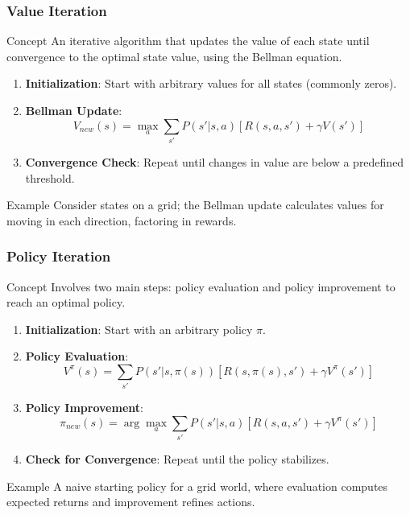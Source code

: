 \documentclass[aspectratio=169]{beamer}
\begin{document}
\begin{frame}[fragile]
    \frametitle{Value Iteration}
    \begin{block}{Concept}
        An iterative algorithm that updates the value of each state until convergence to the optimal state value, using the Bellman equation.
    \end{block}
    \begin{enumerate}
        \item \textbf{Initialization}: Start with arbitrary values for all states (commonly zeros).
        \item \textbf{Bellman Update}:
        \begin{equation}
            V_{new}(s) = \max_{a} \sum_{s'} P(s'|s, a) [R(s, a, s') + \gamma V(s')]
        \end{equation}
        \item \textbf{Convergence Check}: Repeat until changes in value are below a predefined threshold.
    \end{enumerate}
    \begin{block}{Example}
        Consider states on a grid; the Bellman update calculates values for moving in each direction, factoring in rewards.
    \end{block}
\end{frame}

\begin{frame}[fragile]
    \frametitle{Policy Iteration}
    \begin{block}{Concept}
        Involves two main steps: policy evaluation and policy improvement to reach an optimal policy.
    \end{block}
    \begin{enumerate}
        \item \textbf{Initialization}: Start with an arbitrary policy $\pi$.
        \item \textbf{Policy Evaluation}:
        \begin{equation}
            V^\pi(s) = \sum_{s'} P(s'|s, \pi(s)) [R(s, \pi(s), s') + \gamma V^\pi(s')]
        \end{equation}
        \item \textbf{Policy Improvement}:
        \begin{equation}
            \pi_{new}(s) = \arg\max_{a} \sum_{s'} P(s'|s, a) [R(s, a, s') + \gamma V^\pi(s')]
        \end{equation}
        \item \textbf{Check for Convergence}: Repeat until the policy stabilizes.
    \end{enumerate}
    \begin{block}{Example}
        A naive starting policy for a grid world, where evaluation computes expected returns and improvement refines actions.
    \end{block}
\end{frame}
\end{document}
